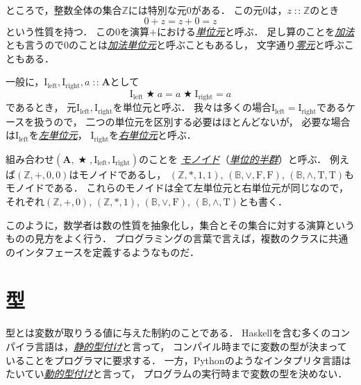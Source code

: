 \documentclass[a5paper,draft]{jsbook}
\newcommand{\programminglanguage}[1]{\textsf{#1}}
\newcommand{\haskell}{\programminglanguage{Haskell}}
\newcommand{\python}{\programminglanguage{Python}}
\newcommand{\keyword}[1]{{\underline{\emph{#1}}}}
\newcommand{\mathConstant}[1]{\mathrm{#1}} %
\newcommand{\mathSub}[1]{\textrm{#1}}
\newcommand{\mathSet}[1]{\mathbf{#1}} %
\newcommand{\mathSpecialSet}[1]{\mathbb{#1}} %
\newcommand{\mathTupleWith}[1]{\left(#1\right)}
\newcommand{\mathFalse}{\mathConstant{F}}
\newcommand{\mathTrue}{\mathConstant{T}}
\newcommand{\mathId}{\mathConstant{I}}
\newcommand{\mathLeft}{\mathSub{left}}
\newcommand{\mathRight}{\mathSub{right}}
\newcommand{\mathBinaryOperator}[1]{\operatorname{#1}}
\newcommand{\mathAnyBinaryOperator}{\mathBinaryOperator{\bigstar}}
\newcommand{\mathIn}{\mathBinaryOperator{:\!:}}
\begin{document}
ところで，整数全体の集合$\mathSpecialSet{Z}$には特別な元$0$がある．
この元$0$は，$z\mathIn\mathSpecialSet{Z}$のとき
\begin{equation}
0+z=z+0=z
\end{equation}
という性質を持つ．
この$0$を演算$+$における\keyword{単位元}と呼ぶ．
足し算のことを\keyword{加法}とも言うので$0$のことは\keyword{加法単位元}と呼ぶこともあるし，
文字通り\keyword{零元}と呼ぶこともある．

一般に，$\mathId_\mathLeft,\mathId_\mathRight,a\mathIn\mathSet{A}$として
\begin{equation}
\label{eq:identity}
\mathId_\mathLeft\mathAnyBinaryOperator a=a\mathAnyBinaryOperator\mathId_\mathRight=a
\end{equation}
であるとき，
元$\mathId_\mathLeft,\mathId_\mathRight$を単位元と呼ぶ．
我々は多くの場合$\mathId_\mathLeft=\mathId_\mathRight$であるケースを扱うので，
二つの単位元を区別する必要はほとんどないが，
必要な場合は$\mathId_\mathLeft$を\keyword{左単位元}，
$\mathId_\mathRight$を\keyword{右単位元}と呼ぶ．

組み合わせ$\mathTupleWith{\mathSet{A},\mathAnyBinaryOperator,\mathId_\mathLeft,\mathId_\mathRight}$のことを
\keyword{モノイド}（\keyword{単位的半群}）と呼ぶ．
例えば$\mathTupleWith{\mathSpecialSet{Z},+,0,0}$はモノイドであるし，
$\mathTupleWith{\mathSpecialSet{Z},*,1,1}$,
$\mathTupleWith{\mathSpecialSet{B},\vee,\mathFalse,\mathFalse}$,
$\mathTupleWith{\mathSpecialSet{B},\wedge,\mathTrue,\mathTrue}$もモノイドである．
これらのモノイドは全て左単位元と右単位元が同じなので，
それぞれ$\mathTupleWith{\mathSpecialSet{Z},+,0}$,
$\mathTupleWith{\mathSpecialSet{Z},*,1}$,
$\mathTupleWith{\mathSpecialSet{B},\vee,\mathFalse}$,
$\mathTupleWith{\mathSpecialSet{B},\wedge,\mathTrue}$とも書く．

このように，数学者は数の性質を抽象化し，集合とその集合に対する演算というものの見方をよく行う．
プログラミングの言葉で言えば，複数のクラスに共通のインタフェースを定義するようなものだ．

\section{型}

型とは変数が取りうる値に与えた制約のことである．
\haskell を含む多くのコンパイラ言語は，\keyword{静的型付け}と言って，
コンパイル時までに変数の型が決まっていることをプログラマに要求する．
一方，\python のようなインタプリタ言語はたいてい\keyword{動的型付け}と言って，
プログラムの実行時まで変数の型を決めない．
\end{document}
